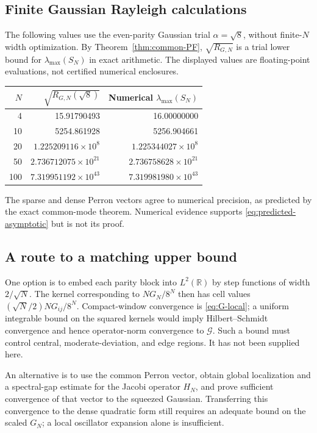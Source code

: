 \documentclass[11pt,reqno]{amsart}
\theoremstyle{definition}\newtheorem{definition}[theorem]{Definition}
\theoremstyle{remark}\newtheorem{remark}[theorem]{Remark}
\newcommand{\RR}{\mathbb R}
\begin{document}
\subsection{Finite Gaussian Rayleigh calculations}
The following values use the even-parity Gaussian trial
$\alpha=\sqrt8$, without finite-$N$ width optimization. By
Theorem~\ref{thm:common-PF}, $\sqrt{R_{G,N}}$ is a trial lower bound
for $\lambda_{\max}(S_N)$ in exact arithmetic. The displayed values
are floating-point evaluations, not certified numerical enclosures.
\begin{center}\small
\begin{tabular}{r|r|r}
$N$&$\sqrt{R_{G,N}(\sqrt8)}$&Numerical $\lambda_{\max}(S_N)$\\\hline
4&15.91790493&16.00000000\\
10&5254.861928&5256.904661\\
20&$1.225209116\times10^8$&$1.225344027\times10^8$\\
50&$2.736712075\times10^{21}$&$2.736758628\times10^{21}$\\
100&$7.319951192\times10^{43}$&$7.319981980\times10^{43}$
\end{tabular}
\end{center}
The sparse and dense Perron vectors agree to numerical precision,
as predicted by the exact common-mode theorem. Numerical evidence
supports \eqref{eq:predicted-asymptotic} but is not its proof.

\subsection{A route to a matching upper bound}
One option is to embed each parity block into $L^2(\RR)$ by step
functions of width $2/\sqrt N$. The kernel corresponding to
$NG_N/8^N$ then has cell values $(\sqrt N/2)NG_{ij}/8^N$.
Compact-window convergence is \eqref{eq:G-local}; a uniform integrable
bound on the squared kernels would imply Hilbert--Schmidt convergence
and hence operator-norm convergence to $\mathcal G$.
Such a bound must control central, moderate-deviation, and edge
regions. It has not been supplied here.

An alternative is to use the common Perron vector, obtain global
localization and a spectral-gap estimate for the Jacobi operator
$H_N$, and prove sufficient convergence of that vector to the squeezed
Gaussian. Transferring this convergence to the dense quadratic form
still requires an adequate bound on the scaled $G_N$; a local
oscillator expansion alone is insufficient.
\end{document}
